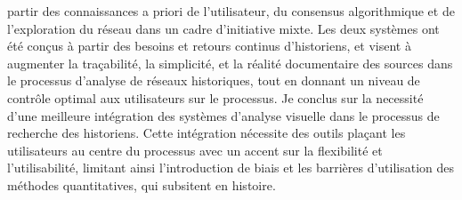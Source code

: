 {partir des connaissances a priori de l'utilisateur, du consensus algorithmique et de l'exploration du réseau dans un cadre d'initiative mixte. Les deux systèmes ont été conçus à partir des besoins et retours continus d'historiens, et visent à augmenter la traçabilité, la simplicité, et la réalité documentaire des sources dans le processus d'analyse de réseaux historiques, tout en donnant un niveau de contrôle optimal aux utilisateurs sur le processus. Je conclus sur la necessité d'une meilleure intégration des systèmes d'analyse visuelle dans le processus de recherche des historiens. Cette intégration nécessite des outils plaçant les utilisateurs au centre du processus avec un accent sur la flexibilité et l'utilisabilité, limitant ainsi l'introduction de biais et les barrières d'utilisation des méthodes quantitatives, qui subsitent en histoire.}